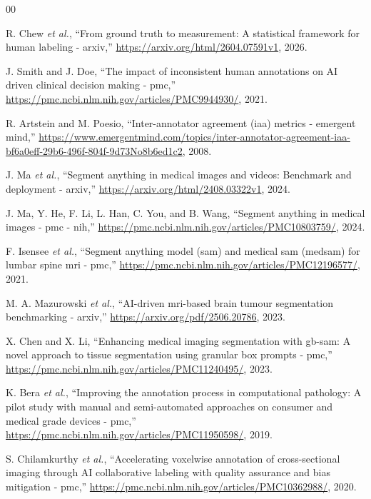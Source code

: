 \documentclass[10pt, conference, letterpaper]{IEEEtran}
\begin{document}
\begin{thebibliography}{00}

 R. Chew \textit{et al.}, ``From ground truth to measurement: A statistical framework for human labeling - arxiv,'' \url{https://arxiv.org/html/2604.07591v1}, 2026.

 J. Smith and J. Doe, ``The impact of inconsistent human annotations on AI driven clinical decision making - pmc,'' \url{https://pmc.ncbi.nlm.nih.gov/articles/PMC9944930/}, 2021.

 R. Artstein and M. Poesio, ``Inter-annotator agreement (iaa) metrics - emergent mind,'' \url{https://www.emergentmind.com/topics/inter-annotator-agreement-iaa-bf6a0eff-29b6-496f-804f-9d73No8b6ed1c2}, 2008.

 J. Ma \textit{et al.}, ``Segment anything in medical images and videos: Benchmark and deployment - arxiv,'' \url{https://arxiv.org/html/2408.03322v1}, 2024.

 J. Ma, Y. He, F. Li, L. Han, C. You, and B. Wang, ``Segment anything in medical images - pmc - nih,'' \url{https://pmc.ncbi.nlm.nih.gov/articles/PMC10803759/}, 2024.

 F. Isensee \textit{et al.}, ``Segment anything model (sam) and medical sam (medsam) for lumbar spine mri - pmc,'' \url{https://pmc.ncbi.nlm.nih.gov/articles/PMC12196577/}, 2021.

 M. A. Mazurowski \textit{et al.}, ``AI-driven mri-based brain tumour segmentation benchmarking - arxiv,'' \url{https://arxiv.org/pdf/2506.20786}, 2023.

 X. Chen and X. Li, ``Enhancing medical imaging segmentation with gb-sam: A novel approach to tissue segmentation using granular box prompts - pmc,'' \url{https://pmc.ncbi.nlm.nih.gov/articles/PMC11240495/}, 2023.

 K. Bera \textit{et al.}, ``Improving the annotation process in computational pathology: A pilot study with manual and semi-automated approaches on consumer and medical grade devices - pmc,'' \url{https://pmc.ncbi.nlm.nih.gov/articles/PMC11950598/}, 2019.

 S. Chilamkurthy \textit{et al.}, ``Accelerating voxelwise annotation of cross-sectional imaging through AI collaborative labeling with quality assurance and bias mitigation - pmc,'' \url{https://pmc.ncbi.nlm.nih.gov/articles/PMC10362988/}, 2020.


\end{thebibliography}
\end{document}
